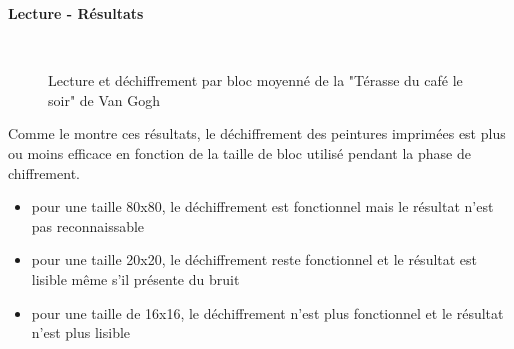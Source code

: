 \documentclass{beamer}
\begin{document}
\begin{frame}[t]
\begin{columns}[t]
\begin{column}{.49\linewidth}
\begin{block}{\centering \textbf{Lecture - Résultats}}
\begin{figure}[t]
\begin{center}
                            \hspace{.05\linewidth}
                            \hspace{.05\linewidth}
                            \\
                            \caption{\centering Lecture et déchiffrement par bloc moyenné de la "Térasse du café le soir" de Van Gogh}
                        \end{center}
                    \end{figure}

                    Comme le montre ces résultats, le déchiffrement des peintures imprimées est plus ou moins efficace en fonction de la taille de bloc utilisé pendant la phase de chiffrement.
                    \begin{itemize}[label=-]
                        \item pour une taille 80x80, le déchiffrement est fonctionnel mais le résultat n'est pas reconnaissable
                        \item pour une taille 20x20, le déchiffrement reste fonctionnel et le résultat est lisible même s'il présente du bruit
                        \item pour une taille de 16x16, le déchiffrement n'est plus fonctionnel et le résultat n'est plus lisible
                    \end{itemize}

                    \vspace{0.5cm}
                \end{block}


\end{column}
\end{columns}
\end{frame}
\end{document}
